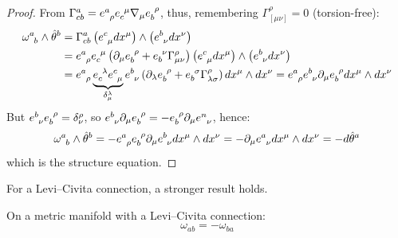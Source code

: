 \begin{proofbox}
  \begin{proof}
    From  $ \Gamma^a_{cb} = \tensor{e}{^a_\rho} \tensor{e}{_c^\mu} \na_\mu \tensor{e}{_b^\rho} $, thus, remembering $ \Gamma^\rho_{[\mu \nu]} = 0 $ (torsion-free):
    \begin{equation*}
      \begin{split}
        \tensor{\omega}{^a_b} \wedge \hat{\theta}^b
        &= \Gamma^a_{cb} \left( \tensor{e}{^c_\mu} dx^\mu \right) \wedge \left( \tensor{e}{^b_\nu} dx^\nu \right) \\
        &= \tensor{e}{^a_\rho} \tensor{e}{_c^\mu} \left( \pa_\mu \tensor{e}{_b^\rho} + \tensor{e}{_b^\nu} \Gamma^\rho_{\mu \nu} \right) \left( \tensor{e}{^c_\mu} dx^\mu \right) \wedge \left( \tensor{e}{^b_\nu} dx^\nu \right) \\
        &= \tensor{e}{^a_\rho} \underbrace{\tensor{e}{_c^\lambda} \tensor{e}{^c_\mu}}_{\delta_\mu^\lambda} \tensor{e}{^b_\nu} \left( \pa_\lambda \tensor{e}{_b^\rho} + \tensor{e}{_b^\sigma} \Gamma^\rho_{\lambda \sigma} \right) dx^\mu \wedge dx^\nu = \tensor{e}{^a_\rho} \tensor{e}{^b_\nu} \pa_\mu \tensor{e}{_b^\rho} dx^\mu \wedge dx^\nu
      \end{split}
    \end{equation*}
    But $ \tensor{e}{^b_\nu} \tensor{e}{_b^\rho} = \delta_\nu^\rho $, so $ \tensor{e}{^b_\nu} \pa_\mu \tensor{e}{_b^\rho} = - \tensor{e}{_b^\rho} \pa_\mu \tensor{e}{^n_\nu} $, hence:
    \begin{equation*}
      \tensor{\omega}{^a_b} \wedge \hat{\theta}^b = - \tensor{e}{^a_\rho} \tensor{e}{_b^\rho} \pa_\mu \tensor{e}{^b_\nu} dx^\mu \wedge dx^\nu = - \pa_\mu \tensor{e}{^a_\nu} dx^\mu \wedge dx^\nu = -d\hat{\theta}^a
    \end{equation*}
    which is the structure equation.
  \end{proof}
\end{proofbox}

For a Levi--Civita connection, a stronger result holds.

\begin{proposition}{}{}
  On a metric manifold with a Levi--Civita connection:
  \begin{equation}
    \omega_{ab} = -\omega_{ba}
    \label{eq:connection-form-symm}
  \end{equation}
\end{proposition}

